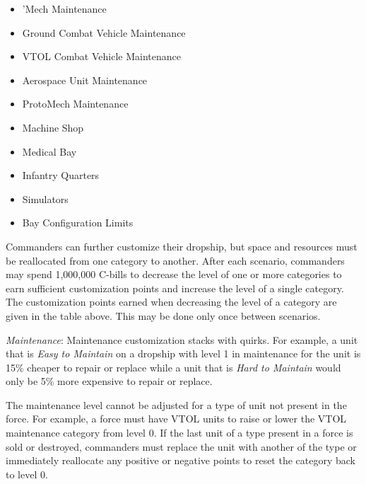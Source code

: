\begin{itemize}

\item 'Mech Maintenance

\item Ground Combat Vehicle Maintenance

\item VTOL Combat Vehicle Maintenance

\item Aerospace Unit Maintenance

\item ProtoMech Maintenance

\item Machine Shop

\item Medical Bay

\item Infantry Quarters

\item Simulators

\item Bay Configuration Limits

\end{itemize}


Commanders can further customize their dropship, but space and resources must be reallocated from one category to another.
After each scenario, commanders may spend 1,000,000 C-bills to decrease the level of one or more categories to earn sufficient customization points and increase the level of a single category.
The customization points earned when decreasing the level of a category are given in the table above.
This may be done only once between scenarios.

\emph{Maintenance}: Maintenance customization stacks with quirks.
For example, a unit that is \emph{Easy to Maintain} on a dropship with level 1 in maintenance for the unit is 15\% cheaper to repair or replace while a unit that is \emph{Hard to Maintain} would only be 5\% more expensive to repair or replace.

The maintenance level cannot be adjusted for a type of unit not present in the force.
For example, a force must have VTOL units to raise or lower the VTOL maintenance category from level 0.
If the last unit of a type present in a force is sold or destroyed, commanders must replace the unit with another of the type or immediately reallocate any positive or negative points to reset the category back to level 0.

